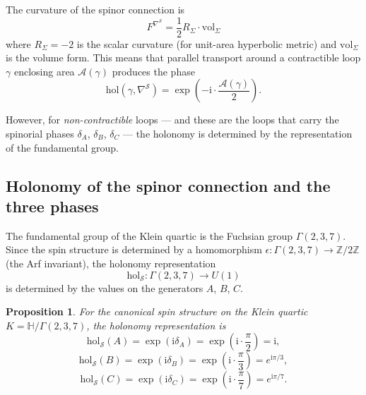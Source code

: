 \documentclass[12pt,a4paper]{article}
\newtheorem{proposition}[theorem]{Proposition}
\theoremstyle{definition}
\theoremstyle{remark}
\newcommand{\ZZ}{\mathbb{Z}}
\newcommand{\HH}{\mathbb{H}}
\newcommand{\hol}{\mathrm{hol}}
\newcommand{\cS}{\mathcal{S}}
\newcommand{\ii}{\mathrm{i}}
\begin{document}
The curvature of the spinor connection is
\begin{equation}
F^{\nabla^{\cS}} = \frac{1}{2} R_{\Sigma} \cdot \mathrm{vol}_{\Sigma}
\end{equation}
where $R_{\Sigma} = -2$ is the scalar curvature (for unit-area hyperbolic metric) and $\mathrm{vol}_{\Sigma}$ is the volume form. This means that parallel transport around a contractible loop $\gamma$ enclosing area $\mathcal{A}(\gamma)$ produces the phase
\begin{equation}
\hol(\gamma, \nabla^{\cS}) = \exp\left(-\ii \cdot \frac{\mathcal{A}(\gamma)}{2}\right).
\end{equation}

However, for \emph{non-contractible} loops --- and these are the loops that carry the spinorial phases $\delta_A$, $\delta_B$, $\delta_C$ --- the holonomy is determined by the representation of the fundamental group.

\subsection{Holonomy of the spinor connection and the three phases}

The fundamental group of the Klein quartic is the Fuchsian group $\Gamma(2,3,7)$. Since the spin structure is determined by a homomorphism $\epsilon \colon \Gamma(2,3,7) \to \ZZ/2\ZZ$ (the Arf invariant), the holonomy representation
\begin{equation}
\hol_{\cS} \colon \Gamma(2,3,7) \to U(1)
\end{equation}
is determined by the values on the generators $A$, $B$, $C$.

\begin{proposition}
For the canonical spin structure on the Klein quartic $K = \HH/\Gamma(2,3,7)$, the holonomy representation is
\begin{equation}
\hol_{\cS}(A) = \exp(\ii \delta_A) = \exp\left(\ii \cdot \frac{\pi}{2}\right) = \ii,
\end{equation}
\begin{equation}
\hol_{\cS}(B) = \exp(\ii \delta_B) = \exp\left(\ii \cdot \frac{\pi}{3}\right) = e^{\ii\pi/3},
\end{equation}
\begin{equation}
\hol_{\cS}(C) = \exp(\ii \delta_C) = \exp\left(\ii \cdot \frac{\pi}{7}\right) = e^{\ii\pi/7}.
\end{equation}
\end{proposition}
\end{document}
